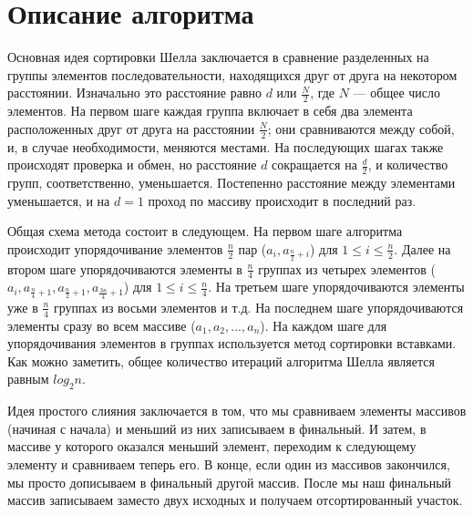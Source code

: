 \documentclass{report}
\begin{document}
\section*{Описание алгоритма}
\par Основная идея сортировки Шелла заключается в сравнение разделенных на группы элементов последовательности, находящихся друг от друга на некотором расстоянии. Изначально это расстояние равно $d$ или $\frac{N}{2}$, где $N$ — общее число элементов. На первом шаге каждая группа включает в себя два элемента расположенных друг от друга на расстоянии $\frac{N}{2}$; они сравниваются между собой, и, в случае необходимости, меняются местами. На последующих шагах также происходят проверка и обмен, но расстояние $d$ сокращается на $\frac{d}{2}$, и количество групп, соответственно, уменьшается. Постепенно расстояние между элементами уменьшается, и на $d=1$ проход по массиву происходит в последний раз.
\par Общая схема метода состоит в следующем. На первом шаге алгоритма происходит упорядочивание элементов $\frac{n}{2}$ пар ($a_i, a_{\frac{n}{2} + i}$) для $1 \leq i \leq \frac{n}{2}$. Далее на втором шаге упорядочиваются элементы в $\frac{n}{4}$ группах из четырех элементов ($a_i, a_{\frac{n}{4} + 1}, a_{\frac{n}{2} + 1}, a_{\frac{3n}{4} + 1}$) для $1 \leq i \leq \frac{n}{4}$. На третьем шаге упорядочиваются элементы уже в $\frac{n}{4}$ группах из восьми элементов и т.д. На последнем шаге упорядочиваются элементы сразу во всем массиве ($a_1 , a_2 , ... , a_n$). На каждом шаге для упорядочивания элементов в группах используется метод сортировки вставками. Как можно заметить, общее количество итераций алгоритма Шелла является равным $log_2 n$.
\par Идея простого слияния заключается в том, что мы сравниваем элементы массивов (начиная с начала) и меньший из них записываем в финальный. И затем, в массиве у которого оказался меньший элемент, переходим к следующему элементу и сравниваем теперь его. В конце, если один из массивов закончился, мы просто дописываем в финальный другой массив. После мы наш финальный массив записываем заместо двух исходных и получаем отсортированный участок.

\newpage

\end{document}
